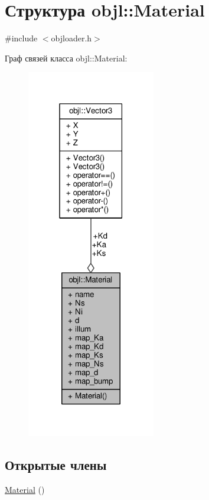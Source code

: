 \hypertarget{structobjl_1_1_material}{}\section{Структура objl\+:\+:Material}
\label{structobjl_1_1_material}


{\ttfamily \#include $<$objloader.\+h$>$}



Граф связей класса objl\+:\+:Material\+:
\nopagebreak
\begin{figure}[H]
\begin{center}
\leavevmode
\includegraphics[width=159pt]{d9/d59/structobjl_1_1_material__coll__graph}
\end{center}
\end{figure}
\subsection*{Открытые члены}
\begin{DoxyCompactItemize}
\item 
\hyperlink{structobjl_1_1_material_a843f0e3ee3a65d2918282969363b76d4}{Material} ()
\end{DoxyCompactItemize}
